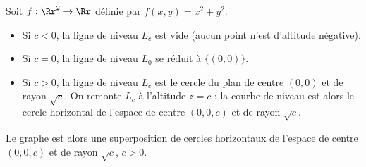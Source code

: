 \begin{exemple}{}{}
	Soit $f : \Rr^2 \to \Rr$ définie par $f(x,y)=x^2+y^2$. 
	
	\begin{itemize}
		\item Si $c<0$, la ligne de niveau $L_c$ est vide (aucun point n'est d'altitude négative).
		\item Si $c=0$, la ligne de niveau $L_0$ se réduit à $\{(0,0)\}$.
		\item Si $c>0$, la ligne de niveau $L_c$  est le cercle du plan de centre $(0,0)$ et de rayon $\sqrt{c}$. On \og{}remonte\fg{} $L_c$ à l'altitude $z=c$ : la courbe de niveau est alors le cercle horizontal de l'espace de centre $(0,0,c)$ et de rayon $\sqrt{c}$. 
	\end{itemize}
	
	Le graphe est alors une superposition de cercles horizontaux de l'espace de centre $(0,0,c)$ et de rayon $\sqrt{c}$, $c>0$.     
	

\end{exemple}
